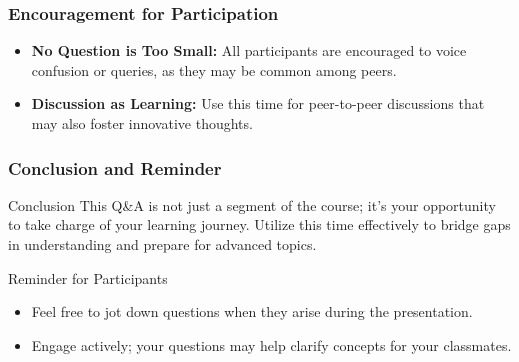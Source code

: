 \documentclass[aspectratio=169]{beamer}
\begin{document}
\begin{frame}[fragile]
    \frametitle{Encouragement for Participation}
    \begin{itemize}
        \item \textbf{No Question is Too Small:} All participants are encouraged to voice confusion or queries, as they may be common among peers.
        \item \textbf{Discussion as Learning:} Use this time for peer-to-peer discussions that may also foster innovative thoughts.
    \end{itemize}
\end{frame}

\begin{frame}[fragile]
    \frametitle{Conclusion and Reminder}
    \begin{block}{Conclusion}
        This Q\&A is not just a segment of the course; it’s your opportunity to take charge of your learning journey. Utilize this time effectively to bridge gaps in understanding and prepare for advanced topics.
    \end{block}
    \begin{block}{Reminder for Participants}
        \begin{itemize}
            \item Feel free to jot down questions when they arise during the presentation.
            \item Engage actively; your questions may help clarify concepts for your classmates.
        \end{itemize}
    \end{block}
\end{frame}
\end{document}
